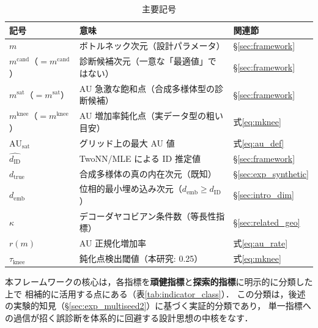\documentclass[11pt,a4paper]{jsarticle}
\newcommand{\dID}{d_{\mathrm{ID}}}
\newcommand{\dzopt}{m^{\mathrm{cand}}}
\newcommand{\dtrue}{d_{\mathrm{true}}}
\newcommand{\kap}{\kappa}
\newcommand{\AUsat}{\mathrm{AU}_{\mathrm{sat}}}
\newcommand{\dzsat}{m^{\mathrm{sat}}}
\newcommand{\mknee}{m^{\mathrm{knee}}}
\newcommand{\demb}{d_{\mathrm{emb}}}
\begin{document}
\begin{table}[H]
\centering
\caption{主要記号}
\label{tab:notation}
\small
\begin{tabular}{lll}
\toprule
記号 & 意味 & 関連節 \\
\midrule
$m$ & ボトルネック次元（設計パラメータ） & §\ref{sec:framework} \\
$\dzopt$（$= m^{\mathrm{cand}}$） & 診断候補次元（一意な「最適値」ではない） & §\ref{sec:framework} \\
$\dzsat$（$= m^{\mathrm{sat}}$） & AU 急激な飽和点（合成多様体型の診断候補） & §\ref{sec:framework} \\
$\mknee$（$= m^{\mathrm{knee}}$） & AU 増加率鈍化点（実データ型の粗い目安） & 式\eqref{eq:mknee} \\
$\AUsat$ & グリッド上の最大 AU 値 & 式\eqref{eq:au_def} \\
$\hat{\dID}$ & TwoNN/MLE による ID 推定値 & §\ref{sec:framework} \\
$\dtrue$ & 合成多様体の真の内在次元（既知） & §\ref{sec:exp_synthetic} \\
$\demb$ & 位相的最小埋め込み次元（$\demb \geq \dID$） & §\ref{sec:intro_dim} \\
$\kap$ & デコーダヤコビアン条件数（等長性指標） & §\ref{sec:related_geo} \\
$r(m)$ & AU 正規化増加率 & 式\eqref{eq:au_rate} \\
$\tau_{\mathrm{knee}}$ & 鈍化点検出閾値（本研究: 0.25） & 式\eqref{eq:mknee} \\
\bottomrule
\end{tabular}
\end{table}

本フレームワークの核心は，各指標を\textbf{頑健指標}と\textbf{探索的指標}に明示的に分類した上で
相補的に活用する点にある（表\ref{tab:indicator_class}）．
この分類は，後述の実験的知見（§\ref{sec:exp_multiseed2}）に基づく実証的分類であり，
単一指標への過信が招く誤診断を体系的に回避する設計思想の中核をなす．
\end{document}
